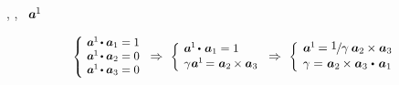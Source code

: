 ,
,
~${\bm{a}^{\hspace{-0.1ex}1}\hspace{-0.1ex}}$

\nopagebreak\vspace{-0.3em}\begin{equation*}
\scalebox{.9}{$\left\{\hspace{-0.16em}\begin{array}{l}
\bm{a}^{\hspace{-0.1ex}1} \hspace{-0.2ex} \dotp \bm{a}_{1} = 1 \\
\bm{a}^{\hspace{-0.1ex}1} \hspace{-0.2ex} \dotp \bm{a}_{2} = 0 \\
\bm{a}^{\hspace{-0.1ex}1} \hspace{-0.2ex} \dotp \bm{a}_{3} = 0 \\[.05em]
\end{array}\right.$}
\Rightarrow\hspace{.33em}
%
\scalebox{.92}{$\left\{\hspace{-0.12em}\begin{array}{l}
\bm{a}^{\hspace{-0.1ex}1} \hspace{-0.2ex} \dotp \hspace{.2ex} \bm{a}_{1} = 1 \\[.1em]
\gamma \hspace{.1ex} \bm{a}^{\hspace{-0.1ex}1} \hspace{-0.2ex} = \hspace{.1ex} \bm{a}_2 \hspace{-0.1ex} \times \bm{a}_3 \\[.08em]
\end{array}\right.$}
\Rightarrow\hspace{.33em}
%
\scalebox{.96}{$\left\{\hspace{-0.11em}\begin{array}{l}
\bm{a}^{\hspace{-0.1ex}1} \hspace{-0.2ex} =
\displaystyle \nicefrac{\scalebox{0.95}{$1$}\hspace{.1ex}}{\scalebox{1.02}{$\gamma$}} \hspace{.5ex}
\bm{a}_2 \hspace{-0.1ex} \times \bm{a}_3 \hspace{.1ex} \\[.08em]
\gamma = \hspace{.1ex} \bm{a}_2 \hspace{-0.1ex} \times \bm{a}_3 \hspace{.1ex} \dotp \hspace{.25ex} \bm{a}_{1} \\[.08em]
\end{array}\right.$}
\end{equation*}

